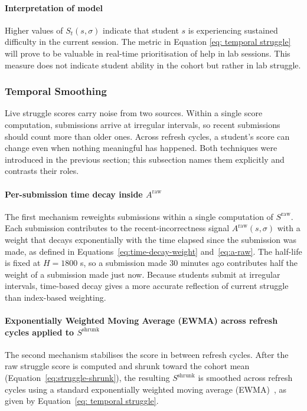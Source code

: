 \paragraph{Interpretation of model}
Higher values of $S_t(s,\sigma)$ indicate that student $s$ is experiencing sustained difficulty in the current session. The metric in Equation \ref{eq: temporal struggle} will prove to be valuable in real-time prioritisation of help in lab sessions. This measure does not indicate student ability in the cohort but rather in lab struggle.

\subsubsection{Temporal Smoothing}
Live struggle scores carry noise from two sources. Within a single score computation, submissions arrive at irregular intervals, so recent submissions should count more than older ones. Across refresh cycles, a student's score can change even when nothing meaningful has happened.
Both techniques were introduced in the previous section; this subsection names them explicitly and contrasts their roles.

\paragraph{Per-submission time decay inside $A^{\mathrm{raw}}$}

The first mechanism reweights submissions within a single computation of $S^{\mathrm{raw}}$.
Each submission contributes to the recent-incorrectness signal $A^{\mathrm{raw}}(s,\sigma)$ with a weight that decays exponentially with the time elapsed since the submission was made, as defined in Equations~\ref{eq:time-decay-weight} and~\ref{eq:a-raw}. 
The half-life is fixed at $H = 1800$ s, so a submission made 30 minutes ago contributes half the weight of a submission made just now. 
Because students submit at irregular intervals, time-based decay gives a more accurate reflection of current struggle than index-based weighting.

\paragraph{Exponentially Weighted Moving Average (EWMA) across refresh cycles applied to $S^{\mathrm{shrunk}}$}

The second mechanism stabilises the score in between refresh cycles. 
After the raw struggle score is computed and shrunk toward the cohort mean (Equation~\ref{eq:struggle-shrunk}), the resulting $S^{\mathrm{shrunk}}$ is smoothed across refresh cycles using a standard exponentially weighted moving average (EWMA)~\cite{hunterExponentiallyWeightedMoving1986}, as given by Equation~\ref{eq: temporal struggle}.

